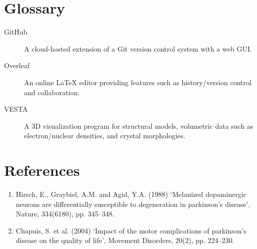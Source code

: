 \documentclass[12pt]{article}
\begin{document}
\section*{Glossary}
\begin{description}
    \item[GitHub] A cloud-hosted extension of a Git version control system with a web GUI.
    \item[Overleaf] An online LaTeX editor providing features such as history/version control and collaboration.
    \item[VESTA] A 3D visualization program for structural models, volumetric data such as electron/nuclear densities, and crystal morphologies.
\end{description}

\section*{References}
\begin{enumerate}
	\item Hirsch, E., Graybiel, A.M. and Agid, Y.A. (1988) ‘Melanized dopaminergic neurons are differentially susceptible to degeneration in parkinson’s disease’, Nature, 334(6180), pp. 345–348.

	\item Chapuis, S. et al. (2004) ‘Impact of the motor complications of parkinson’s disease on the quality of life’, Movement Disorders, 20(2), pp. 224–230.


\end{enumerate}
\end{document}

